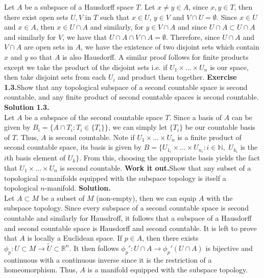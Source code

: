 \documentclass{article}
\begin{document}
        Let $A$ be a subspace of a Hausdorff space $T$. Let $x\neq y\in A$, since $x,y\in T$, then there exist open sets $U,V$
        in $T$ such that $x\in U$, $y\in V$ and $V\cap U=\emptyset$. Since $x\in U$ and $x\in A$, then $x\in U\cap A$ and similarly,
        for $y\in V\cap A$ and since $U\cap A\subset U\cap A$ and similarly for $V$, we have that $U\cap A \cap V \cap A = \emptyset$.
        Therefore, since $U\cap A$ and $V\cap A$ are open sets in $A$, we have the existence of two disjoint sets which contain
        $x$ and $y$ so that $A$ is also Hausdorff. A similar proof follows for finite products except we take the product of
        the disjoint sets i.e. if $U_1\times\hdots\times U_n$ is our space, then take disjoint sets from each $U_i$ and product
        them together.
    \newline
    \newline
    \textbf{Exercise 1.3.}\qquad Show that any topological subspace of a second countable space is second countable,
    and any finite product of second countable spaces is second countable.
    \newline
    \newline
    \textbf{Solution 1.3.}\\

        Let $A$ be a subspace of the second countable space $T$. Since a basis of $A$ can be given by $B_i 
        = \{A \cap T_i: T_i\in\{T_i\}\}$, we can simply let $\{T_i\}$ be our countable basis of $T$. Thus, $A$ is second countable.
        Note if $U_1\times\hdots\times U_n$ is a finite product of second countable space, its basis is given by
        $B = \{U_{1_i}\times\hdots\times U_{n_i}: i\in\mathbb{N},$ $U_{k_i}$ is the $i$th basis element of $U_k\}$. 
        From this, choosing the appropriate basis yields the fact that $U_1\times\hdots\times U_n$ is second countable.
    \newline
    \newline
    \textbf{Work it out.}\qquad Show that any subset of a topological $n$-manifolds equipped with the subspace
    topology is itself a topological $n$-manifold.
    \newline
    \newline
    \textbf{Solution.}\\

        Let $A\subset M$ be a subset of $M$ (non-empty), then we can equip $A$ with the subspace topology.
        Since every subspace of a second countable space is second countable and similarly for Hausdroff, it follows that a subspace
        of a Hausdorff and second countable space is Hausdorff and second countable. It is left to prove that $A$ is locally
        a Euclidean space. If $p\in A$, then there exists $\phi_p: U\subset M\to \tilde{U}\subset\mathbb{R}^n$. It then follows
        $\phi_p': U\cap A \to \phi_p'(U\cap A)$ is bijective and continuous with a continuous inverse since it is the restriction
        of a homeomorphism. Thus, $A$ is a manifold equipped with the subspace topology.
    \newline
    \newline
\end{document}
